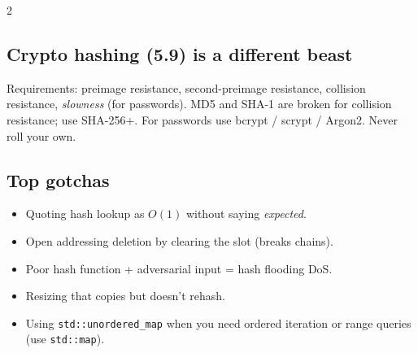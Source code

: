 \documentclass[10pt]{article}
\begin{document}
\begin{multicols}{2}
\subsection*{Crypto hashing (5.9) is a different beast}
Requirements: preimage resistance, second-preimage resistance, collision
resistance, \emph{slowness} (for passwords). MD5 and SHA-1 are broken
for collision resistance; use SHA-256+. For passwords use bcrypt /
scrypt / Argon2. Never roll your own.

\subsection*{Top gotchas}
\begin{itemize}
    \item Quoting hash lookup as $O(1)$ without saying \emph{expected}.
    \item Open addressing deletion by clearing the slot (breaks chains).
    \item Poor hash function + adversarial input = hash flooding DoS.
    \item Resizing that copies but doesn't rehash.
    \item Using \texttt{std::unordered\_map} when you need ordered
    iteration or range queries (use \texttt{std::map}).
\end{itemize}

\end{multicols}
\end{document}
